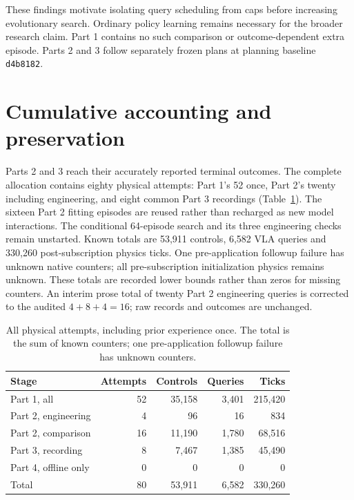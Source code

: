 \documentclass[sigconf,dvipsnames]{acmart}
\begin{document}
These findings motivate isolating query scheduling from caps before increasing
evolutionary search. Ordinary policy learning remains necessary for the broader
research claim. Part 1 contains no such comparison or outcome-dependent extra episode.
Parts 2 and 3 follow separately frozen plans at planning baseline \texttt{d4b8182}.







\section{Cumulative accounting and preservation}
Parts 2 and 3 reach their accurately reported terminal outcomes. The
complete allocation contains eighty physical attempts: Part 1's 52 once,
Part 2's twenty including engineering, and eight common Part 3 recordings
(Table~\ref{tab:cumulative}). The sixteen Part 2 fitting episodes are reused rather
than recharged as new model interactions. The conditional 64-episode search and
its three engineering checks remain unstarted. Known totals are 53,911 controls,
6,582 VLA queries and 330,260 post-subscription physics ticks. One pre-application
followup failure has unknown native counters; all pre-subscription initialization
physics remains unknown. These totals are recorded lower bounds rather than zeros
for missing counters. An interim prose total of twenty Part 2 engineering queries
is corrected to the audited $4+8+4=16$; raw records and outcomes are unchanged.

\begin{table}[t]
\caption{All physical attempts, including prior experience once. The total is the
sum of known counters; one pre-application followup failure has unknown counters.}
\label{tab:cumulative}
\begin{tabular}{lrrrr}
\toprule
Stage & Attempts & Controls & Queries & Ticks \\
\midrule
Part 1, all & 52 & 35,158 & 3,401 & 215,420 \\
Part 2, engineering & 4 & 96 & 16 & 834 \\
Part 2, comparison & 16 & 11,190 & 1,780 & 68,516 \\
Part 3, recording & 8 & 7,467 & 1,385 & 45,490 \\
Part 4, offline only & 0 & 0 & 0 & 0 \\
Total & 80 & 53,911 & 6,582 & 330,260 \\
\bottomrule
\end{tabular}
\end{table}
\end{document}
